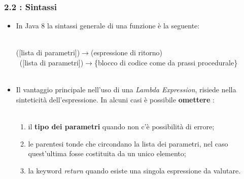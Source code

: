 \documentclass{beamer}
\begin{document}

\begin{frame}
	\frametitle{\textbf{2.2 : Sintassi}}
	\begin{itemize}
		\item
			In Java 8 la sintassi generale di una funzione è la seguente:\\\
			\begin{center}
				\Large ([lista di parametri])$\rightarrow$(espressione di ritorno)\\\
				\Large ([lista di parametri])$\rightarrow$\{blocco di codice come da prassi procedurale\}\\\
			\end{center}
		\item 
			Il vantaggio principale nell'uso di una \textit{Lambda Expression}, risiede nella sinteticità dell'espressione. In alcuni casi è possibile \textbf{omettere} :\\\
			\begin{enumerate}
				\item
					il \textbf{tipo dei parametri} quando non c'è possibilit\`a di errore;\\
				\item
					le parentesi tonde che circondano la lista dei parametri, nel caso quest'ultima fosse costituita da un unico elemento;\\
				\item
					la keyword \emph{return} quando esiste una singola espressione da valutare.		
			\end{enumerate}
	\end{itemize}	
\end{frame}

\end{document}
